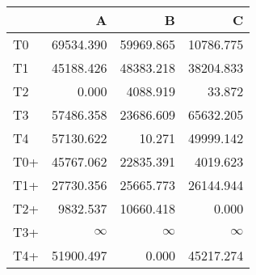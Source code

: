 \begin{tabular}{lrrr}
\toprule
     &         A &         B &         C \\
\midrule
 T0  & \num{69534.390} & \num{59969.865} & \num{10786.775} \\
 T1  & \num{45188.426} & \num{48383.218} & \num{38204.833} \\
 T2  &     \num{0.000} &  \num{4088.919} &    \num{33.872} \\
 T3  & \num{57486.358} & \num{23686.609} & \num{65632.205} \\
 T4  & \num{57130.622} &    \num{10.271} & \num{49999.142} \\
 T0+ & \num{45767.062} & \num{22835.391} &  \num{4019.623} \\
 T1+ & \num{27730.356} & \num{25665.773} & \num{26144.944} \\
 T2+ &  \num{9832.537} & \num{10660.418} &     \num{0.000} \\
 T3+ &  $\infty$    &  $\infty$    &  $\infty$    \\
 T4+ & \num{51900.497} &     \num{0.000} & \num{45217.274} \\
\bottomrule
\end{tabular}